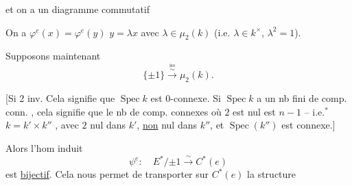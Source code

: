 et on a un  diagramme commutatif


On a $\varphi^e(x)=\varphi^e(y)$  $y=\lambda x$ avec $\lambda\in\mu_2(k)$ (i.e. $\lambda\in k^\times$, $\lambda^2=1$).

Supposons maintenant
\[
 \{\pm1\}\xrightarrow{\overset{\text{iso}}{\sim}}\mu_2(k).
\]

[Si 2 inv. Cela signifie que $\operatorname{Spec}k$ est 0-connexe. Si $\operatorname{Spec}k$ a un nb fini  de comp. conn. , cela signifie que  le nb de comp. connexes où $2$ est nul est $n-1$ -- i.e.$^*$ $k=k'\times k''$  , avec $2$ nul dans $k'$, \uline{non} nul dans $k''$, et $\operatorname{Spec}(k'')$ est  connexe.]


Alors l'hom induit
\[
 \psi^e:\quad E^*/{\pm1}\xrightarrow{\sim}C^*(e)
\]
est \uline{bijectif}. Cela nous permet de transporter sur $C^*(e)$ la structure

